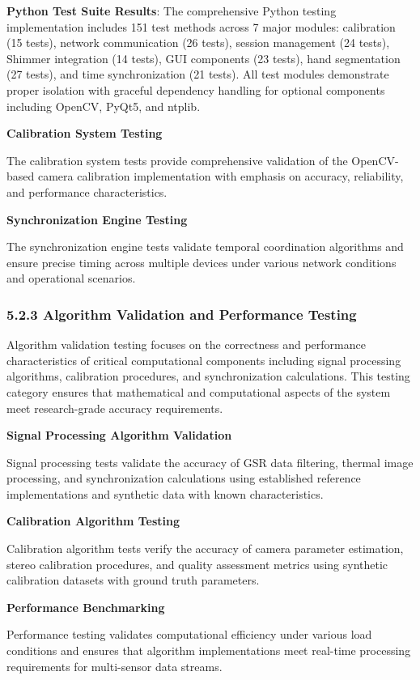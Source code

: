 \documentclass[12pt,a4paper]{article}
\begin{document}
\textbf{Python Test Suite Results}: The comprehensive Python testing implementation includes 151 test methods across 7 
major modules: calibration (15 tests), network communication (26 tests), session management (24 tests), Shimmer 
integration (14 tests), GUI components (23 tests), hand segmentation (27 tests), and time synchronization (21 tests). 
All test modules demonstrate proper isolation with graceful dependency handling for optional components including 
OpenCV, PyQt5, and ntplib.

\textbf{Calibration System Testing}

The calibration system tests provide comprehensive validation of the OpenCV-based camera calibration implementation with
emphasis on accuracy, reliability, and performance characteristics.

\textbf{Synchronization Engine Testing}

The synchronization engine tests validate temporal coordination algorithms and ensure precise timing across multiple
devices under various network conditions and operational scenarios.

\subsubsection{5.2.3 Algorithm Validation and Performance Testing}

Algorithm validation testing focuses on the correctness and performance characteristics of critical computational
components including signal processing algorithms, calibration procedures, and synchronization calculations. This
testing category ensures that mathematical and computational aspects of the system meet research-grade accuracy
requirements.

\textbf{Signal Processing Algorithm Validation}

Signal processing tests validate the accuracy of GSR data filtering, thermal image processing, and synchronization
calculations using established reference implementations and synthetic data with known characteristics.

\textbf{Calibration Algorithm Testing}

Calibration algorithm tests verify the accuracy of camera parameter estimation, stereo calibration procedures, and
quality assessment metrics using synthetic calibration datasets with ground truth parameters.

\textbf{Performance Benchmarking}

Performance testing validates computational efficiency under various load conditions and ensures that algorithm
implementations meet real-time processing requirements for multi-sensor data streams.
\end{document}
